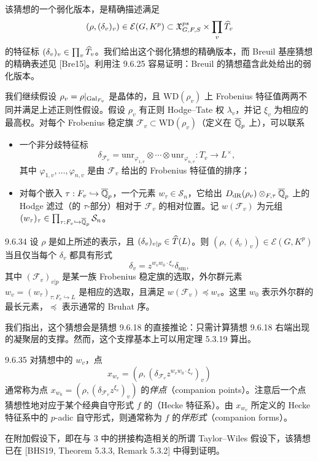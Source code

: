 该猜想的一个弱化版本，是精确描述满足
\[
(\rho,(\delta_v)_v)\in\mathcal E(G,K^p)\subset\mathfrak X^{ps}_{G,F,S}\times\prod_v\widehat T_v
\]
的特征标 $(\delta_v)_v\in\prod_v\widehat T_v$。我们给出这个弱化猜想的精确版本，而 Breuil 基座猜想的精确表述见 [Bre15]。利用注 9.6.25 容易证明：Breuil 的猜想蕴含此处给出的弱化版本。

我们继续假设 $\rho_v=\rho|_{\operatorname{Gal}_{F_v}}$ 是晶体的，且 $\mathrm{WD}(\rho_v)$ 上 Frobenius 特征值两两不同并满足上述正则性假设。假设 $\rho_v$ 有正则 Hodge--Tate 权 $\lambda_v$，并记 $\xi_v$ 为相应的最高权。对每个 Frobenius 稳定旗 $\mathcal F_v\subset\mathrm{WD}(\rho_v)$（定义在 $\overline{\mathbb{Q}}_p$ 上），可以联系
\begin{itemize}
\item 一个非分歧特征标
\[
\delta_{\mathcal F_v}=\mathrm{unr}_{\varphi_{1,v}}\otimes\cdots\otimes\mathrm{unr}_{\varphi_{n,v}}:T_v\to L^\times,
\]
其中 $\varphi_{1,v},\dots,\varphi_{n,v}$ 是由 $\mathcal F_v$ 给出的 Frobenius 特征值的排序；
\item 对每个嵌入 $\tau:F_v\hookrightarrow\overline{\mathbb{Q}}_p$，一个元素 $w_\tau\in\mathcal S_n$，它给出 $D_{\mathrm{dR}}(\rho_v)\otimes_{F,\tau}\overline{\mathbb{Q}}_p$ 上的 Hodge 滤过（的 $\tau$-部分）相对于 $\mathcal F_v$ 的相对位置。记 $w(\mathcal F_v)$ 为元组 $(w_\tau)_\tau\in\prod_{\tau:F_v\hookrightarrow\overline{\mathbb{Q}}_p}\mathcal S_n$。
\end{itemize}

\begin{conj}{9.6.34}\label{conj:a4-16-9-6-34}
设 $\rho$ 是如上所述的表示，且 $(\delta_v)_{v|p}\in\widehat T(L)$。则 $(\rho,(\delta_v)_v)\in\mathcal E(G,K^p)$ 当且仅当每个 $\delta_v$ 都具有形式
\[
\delta_v=z^{w_vw_0\cdot\xi_v}\delta_{\mathrm{sm}},
\]
其中 $(\mathcal F_v)_{v|p}$ 是某一族 Frobenius 稳定旗的选取，外尔群元素 $w_v=(w_\tau)_{\tau:F_v\hookrightarrow L}$ 是相应的选取，且满足 $w(\mathcal F_v)\preceq w_v$。这里 $w_0$ 表示外尔群的最长元素，$\preceq$ 表示通常的 Bruhat 序。
\end{conj}

我们指出，这个猜想会是猜想 9.6.18 的直接推论：只需计算猜想 9.6.18 右端出现的凝聚层的支撑。然而，这个支撑基本上可以用定理 5.3.19 算出。

\begin{rem}{9.6.35}\label{rem:a4-16-9-6-35}
对猜想中的 $w_v$，点
\[
x_{w_v}=(\rho,(\delta_{\mathcal F_v}z^{w_vw_0\cdot\xi_v})_v)
\]
通常称为点 $x_{w_0}=(\rho,(\delta_{\mathcal F_v}z^{\xi_v})_v)$ 的\emph{伴点}（companion points）。注意后一个点猜想性地对应于某个经典自守形式 $f$ 的（Hecke 特征系）。由 $x_{w_v}$ 所定义的 Hecke 特征系中的 $p$-adic 自守形式，则通常称为 $f$ 的\emph{伴形式}（companion forms）。

在附加假设下，即在与 3 中的拼接构造相关的所谓 Taylor--Wiles 假设下，该猜想已在 [BHS19, Theorem 5.3.3, Remark 5.3.2] 中得到证明。
\end{rem}

